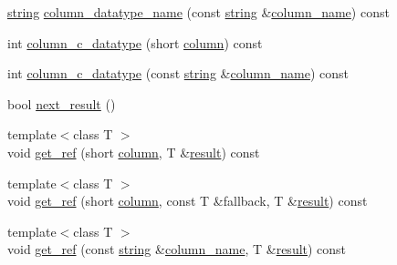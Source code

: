 \begin{DoxyCompactItemize}
\item 
\mbox{\hyperlink{namespacenanodbc_abfc0ece56278e590911ec8352774c212}{string}} \mbox{\hyperlink{classnanodbc_1_1result_1_1result__impl_a752600f587af2fee42cfd7dcdc144fa6}{column\+\_\+datatype\+\_\+name}} (const \mbox{\hyperlink{namespacenanodbc_abfc0ece56278e590911ec8352774c212}{string}} \&\mbox{\hyperlink{classnanodbc_1_1result_1_1result__impl_a5a02e1effc6a3372b6769d54d04abe2e}{column\+\_\+name}}) const
\item 
int \mbox{\hyperlink{classnanodbc_1_1result_1_1result__impl_ade6c0091bf4263f56ef20601043f4a2c}{column\+\_\+c\+\_\+datatype}} (short \mbox{\hyperlink{classnanodbc_1_1result_1_1result__impl_a3863b14d505105da14acf42e7bc4ca03}{column}}) const
\item 
int \mbox{\hyperlink{classnanodbc_1_1result_1_1result__impl_a42bc1467b6b93ca1b0583532d543334b}{column\+\_\+c\+\_\+datatype}} (const \mbox{\hyperlink{namespacenanodbc_abfc0ece56278e590911ec8352774c212}{string}} \&\mbox{\hyperlink{classnanodbc_1_1result_1_1result__impl_a5a02e1effc6a3372b6769d54d04abe2e}{column\+\_\+name}}) const
\item 
bool \mbox{\hyperlink{classnanodbc_1_1result_1_1result__impl_af3de5362a55a57501673e310c224a880}{next\+\_\+result}} ()
\item 
{\footnotesize template$<$class T $>$ }\\void \mbox{\hyperlink{classnanodbc_1_1result_1_1result__impl_adabb4d9ae0421f0a5e7b92820b785efb}{get\+\_\+ref}} (short \mbox{\hyperlink{classnanodbc_1_1result_1_1result__impl_a3863b14d505105da14acf42e7bc4ca03}{column}}, T \&\mbox{\hyperlink{classnanodbc_1_1result}{result}}) const
\item 
{\footnotesize template$<$class T $>$ }\\void \mbox{\hyperlink{classnanodbc_1_1result_1_1result__impl_ad5042fe5c38974cfe90ed3eb00fb9f84}{get\+\_\+ref}} (short \mbox{\hyperlink{classnanodbc_1_1result_1_1result__impl_a3863b14d505105da14acf42e7bc4ca03}{column}}, const T \&fallback, T \&\mbox{\hyperlink{classnanodbc_1_1result}{result}}) const
\item 
{\footnotesize template$<$class T $>$ }\\void \mbox{\hyperlink{classnanodbc_1_1result_1_1result__impl_aa8f36e2abf3d3440bc98c7bf8fe282f4}{get\+\_\+ref}} (const \mbox{\hyperlink{namespacenanodbc_abfc0ece56278e590911ec8352774c212}{string}} \&\mbox{\hyperlink{classnanodbc_1_1result_1_1result__impl_a5a02e1effc6a3372b6769d54d04abe2e}{column\+\_\+name}}, T \&\mbox{\hyperlink{classnanodbc_1_1result}{result}}) const

\end{DoxyCompactItemize}
